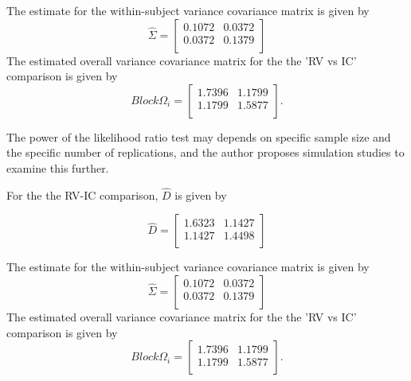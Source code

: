 \documentclass[12pt, a4paper]{report}
\theoremstyle{plain}
\theoremstyle{definition}
\theoremstyle{remark}
\begin{document}
	The estimate for the within-subject variance covariance matrix is
	given by
	\begin{equation}
	\hat{\Sigma}= \left[ \begin{array}{cc}
	0.1072 & 0.0372  \\
	0.0372 & 0.1379  \\
	\end{array}\right]
	\end{equation}
	The estimated overall variance covariance matrix for the the 'RV
	vs IC' comparison is given by
	\begin{equation}
	Block \Omega_{i}= \left[ \begin{array}{cc}
	1.7396 & 1.1799  \\
	1.1799 & 1.5877  \\
	\end{array} \right].
	\end{equation}
	
	The power of the
	likelihood ratio test may depends on specific sample size and the
	specific number of  replications, and the author proposes
	simulation studies to examine this further.
	
	
	
	For the the RV-IC comparison, $\hat{D}$ is given by
	
	
	\begin{equation}
	\hat{D}= \left[ \begin{array}{cc}
	1.6323 & 1.1427  \\
	1.1427 & 1.4498 \\
	\end{array} \right]
	\end{equation}
	
	The estimate for the within-subject variance covariance matrix is
	given by
	\begin{equation}
	\hat{\Sigma}= \left[ \begin{array}{cc}
	0.1072 & 0.0372  \\
	0.0372 & 0.1379  \\
	\end{array}\right]
	\end{equation}
	The estimated overall variance covariance matrix for the the 'RV
	vs IC' comparison is given by
	\begin{equation}
	Block \Omega_{i}= \left[ \begin{array}{cc}
	1.7396 & 1.1799  \\
	1.1799 & 1.5877  \\
	\end{array} \right].
	\end{equation}
	
\end{document}
